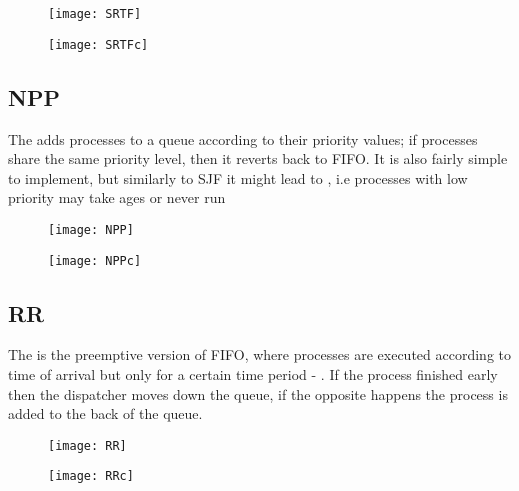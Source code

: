 		\begin{figure}[H]
		\begin{center}
		\texttt{[image: SRTF]}
		\end{center}
		\begin{center}
		\texttt{[image: SRTFc]}
		\end{center}
	\end{figure}

	\subsection{NPP}

		\par{The  adds processes to a queue according to their priority values; if processes share the same priority level, then it reverts back to FIFO. It is also fairly simple to implement, but similarly to SJF it might lead to , i.e processes with low priority may take ages or never run}

		\begin{figure}[H]
		\begin{center}
		\texttt{[image: NPP]}
		\end{center}
		\begin{center}
		\texttt{[image: NPPc]}
		\end{center}
	\end{figure}

	\subsection{RR}

		\par{The  is the preemptive version of FIFO, where processes are executed according to time of arrival but only for a certain time period - . If the process finished early then the dispatcher moves down the queue, if the opposite happens the process is added to the back of the queue.}

		\begin{figure}[H]
		\begin{center}
		\texttt{[image: RR]}
		\end{center}
		\begin{center}
		\texttt{[image: RRc]}
		\end{center}
	\end{figure}

